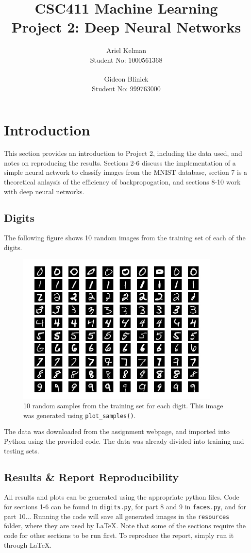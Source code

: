 \documentclass{article}
\title{CSC411 Machine Learning \\ Project 2: Deep Neural Networks}
\author{ Ariel Kelman \\ Student No: 1000561368
         \\ \\
         Gideon Blinick \\ Student No: 999763000 }
\begin{document}
   \maketitle{}


   \section{Introduction}
   This section provides an introduction to Project 2, including the data used, and notes
   on reproducing the results. Sections 2-6 discuss the implementation of a simple neural
   network to classify images from the MNIST database, section 7 is a theoretical anlaysis
   of the efficiency of backpropogation, and sections 8-10 work with deep neural networks.

   \subsection{Digits}
   The following figure shows 10 random images from the training set of each of the digits.
   \begin{figure}[H] \centering
      \includegraphics[width=4in]{resources/part1}
      \caption{10 random samples from the training set for each digit. This image
         was generated using \texttt{plot\_samples()}. }
   \end{figure}
   The data was downloaded from the assignment webpage, and imported into Python using the
   provided code. The data was already divided into training and testing sets.

   \subsection{Results \& Report Reproducibility}
   All results and plots can be generated using the appropriate python files.
   Code for sections 1-6 can be found in \texttt{digits.py}, for part 8 and 9 in \texttt{faces.py},
   and for part 10...
   Running the code will save all generated images in the \texttt{resources} folder,
   where they are used by \LaTeX. Note that some of the sections require the code for
   other sections to be run first.
   To reproduce the report, simply run it through \LaTeX.
\end{document}
